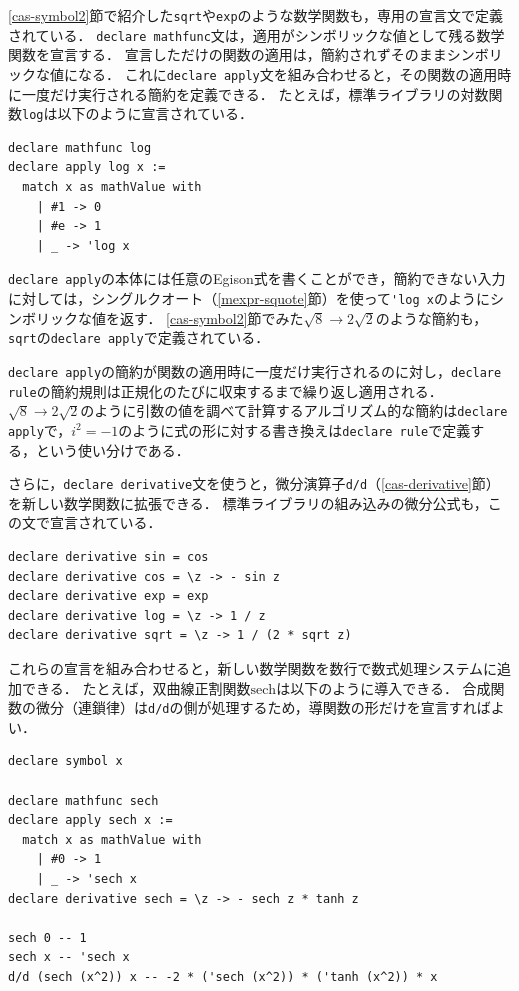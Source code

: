 \ref{cas-symbol2}節で紹介した\lstinline{sqrt}や\lstinline{exp}のような数学関数も，専用の宣言文で定義されている．
\lstinline{declare mathfunc}文は，適用がシンボリックな値として残る数学関数を宣言する．
宣言しただけの関数の適用は，簡約されずそのままシンボリックな値になる．
これに\lstinline{declare apply}文を組み合わせると，その関数の適用時に一度だけ実行される簡約を定義できる．
たとえば，標準ライブラリの対数関数\lstinline{log}は以下のように宣言されている．
\begin{lstlisting}[language=egison,numbers=none]
declare mathfunc log
declare apply log x :=
  match x as mathValue with
    | #1 -> 0
    | #e -> 1
    | _ -> 'log x
\end{lstlisting}
\lstinline{declare apply}の本体には任意のEgison式を書くことができ，簡約できない入力に対しては，シングルクオート（\ref{mexpr-squote}節）を使って\lstinline{'log x}のようにシンボリックな値を返す．
\ref{cas-symbol2}節でみた$\sqrt{8} \rightarrow 2\sqrt{2}$のような簡約も，\lstinline{sqrt}の\lstinline{declare apply}で定義されている．

\lstinline{declare apply}の簡約が関数の適用時に一度だけ実行されるのに対し，\lstinline{declare rule}の簡約規則は正規化のたびに収束するまで繰り返し適用される．
$\sqrt{8} \rightarrow 2\sqrt{2}$のように引数の値を調べて計算するアルゴリズム的な簡約は\lstinline{declare apply}で，$i^2 = -1$のように式の形に対する書き換えは\lstinline{declare rule}で定義する，という使い分けである．

さらに，\lstinline{declare derivative}文を使うと，微分演算子\lstinline{d/d}（\ref{cas-derivative}節）を新しい数学関数に拡張できる．
標準ライブラリの組み込みの微分公式も，この文で宣言されている．
\begin{lstlisting}[language=egison,numbers=none]
declare derivative sin = cos
declare derivative cos = \z -> - sin z
declare derivative exp = exp
declare derivative log = \z -> 1 / z
declare derivative sqrt = \z -> 1 / (2 * sqrt z)
\end{lstlisting}

これらの宣言を組み合わせると，新しい数学関数を数行で数式処理システムに追加できる．
たとえば，双曲線正割関数$\mathrm{sech}$は以下のように導入できる．
合成関数の微分（連鎖律）は\lstinline{d/d}の側が処理するため，導関数の形だけを宣言すればよい．
\begin{lstlisting}[language=egison,numbers=none]
declare symbol x

declare mathfunc sech
declare apply sech x :=
  match x as mathValue with
    | #0 -> 1
    | _ -> 'sech x
declare derivative sech = \z -> - sech z * tanh z

sech 0 -- 1
sech x -- 'sech x
d/d (sech (x^2)) x -- -2 * ('sech (x^2)) * ('tanh (x^2)) * x
\end{lstlisting}

